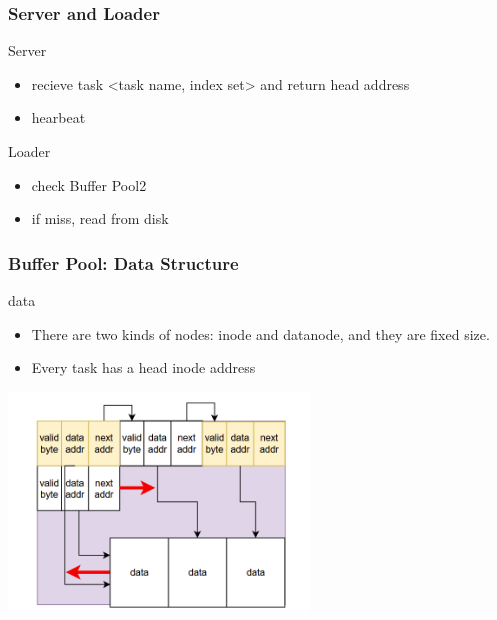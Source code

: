 \documentclass[notheorems, aspectratio=54]{beamer}
\begin{document}
\begin{frame}
    \frametitle{Server and Loader}
    \begin{block}{Server}
        \begin{itemize}
            \item recieve task <task name, index set> and return head address
            \item hearbeat
        \end{itemize}
    \end{block}
    \begin{block}{Loader}
        \begin{itemize}
            \item check Buffer Pool2
            \item if miss, read from disk
        \end{itemize}
    \end{block}
\end{frame}


\begin{frame}
    \frametitle{Buffer Pool: Data Structure}
    \begin{block} {data}
        \begin{itemize}
            \item There are two kinds of nodes: inode and datanode, and they are fixed size.
            \item Every task has a head inode address
        \end{itemize}
    \end{block}
    \centering
    \includegraphics[width=8cm]{global_img_dir/linklist.png}
\end{frame}
\end{document}
